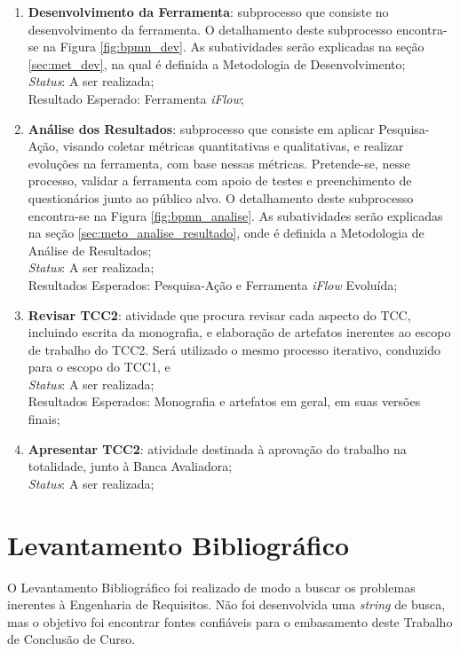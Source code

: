 \begin{enumerate}
    \item \textbf{Desenvolvimento da Ferramenta}: subprocesso que consiste no desenvolvimento da ferramenta. O detalhamento deste subprocesso encontra-se na Figura \ref{fig:bpmn_dev}. As subatividades serão explicadas na seção \ref{sec:met_dev}, na qual é definida a Metodologia de Desenvolvimento;
    \\
    \textit{Status}: A ser realizada;
    \\
    Resultado Esperado: Ferramenta \textit{iFlow};
    \item \textbf{Análise dos Resultados}: subprocesso que consiste em aplicar Pesquisa-Ação, visando coletar métricas quantitativas e qualitativas, e realizar evoluções na ferramenta, com base nessas métricas. Pretende-se, nesse processo, validar a ferramenta com apoio de testes e preenchimento de questionários junto ao público alvo. O detalhamento deste subprocesso encontra-se na Figura \ref{fig:bpmn_analise}. As subatividades serão explicadas na seção \ref{sec:meto_analise_resultado}, onde é definida a Metodologia de Análise de Resultados;
    \\
    \textit{Status}: A ser realizada;
    \\
    Resultados Esperados: Pesquisa-Ação e Ferramenta \textit{iFlow} Evoluída;
    \item \textbf{Revisar TCC2}: atividade que procura revisar cada aspecto do TCC, incluindo escrita da monografia, e elaboração de artefatos inerentes ao escopo de trabalho do TCC2. Será utilizado o mesmo processo iterativo, conduzido para o escopo do TCC1, e
    \\
    \textit{Status}: A ser realizada;
    \\
    Resultados Esperados: Monografia e artefatos em geral, em suas versões finais;
    \item \textbf{Apresentar TCC2}: atividade destinada à aprovação do trabalho na totalidade, junto à Banca Avaliadora;
    \\
    \textit{Status}: A ser realizada;
\end{enumerate}

\section{Levantamento Bibliográfico}

\label{sec:levantamento_bibliografico}

O Levantamento Bibliográfico foi realizado de modo a buscar os problemas inerentes à Engenharia de Requisitos. Não foi desenvolvida uma \textit{string} de busca, mas o objetivo foi encontrar fontes confiáveis para o embasamento deste Trabalho de Conclusão de Curso.

